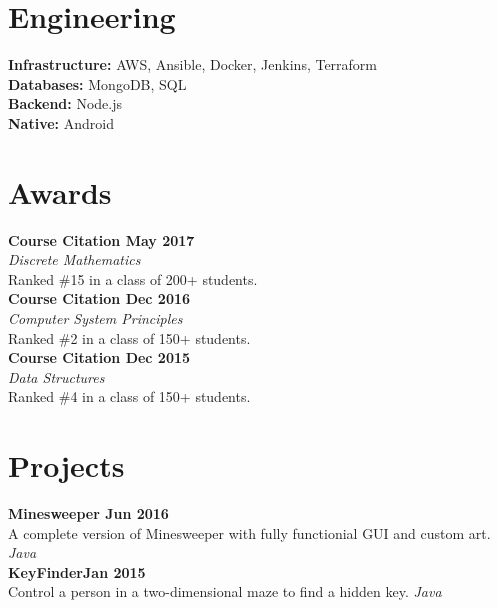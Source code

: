 \documentclass[letterpaper]{deedy-resume} %
\begin{document}
\begin{minipage}[t]{0.32\textwidth}
\section{Engineering}


{\bf Infrastructure:}
AWS, Ansible, Docker, Jenkins, Terraform \\  
{\bf Databases:}
MongoDB, SQL \\
{\bf Backend:} 
Node.js \\
{\bf Native:}
Android

\sectionspace %

\section{Awards}
{\bf Course Citation \hfill May 2017} \\ 
\textit{Discrete Mathematics} \\ 
Ranked \#15 in a class of 200+ students.\\
\vspace{2mm}
{\bf Course Citation \hfill Dec 2016} \\ 
\textit{Computer System Principles} \\ 
Ranked \#2 in a class of 150+ students.\\
\vspace{2mm}
{\bf Course Citation \hfill Dec 2015} \\ \textit{Data Structures} \\
 Ranked \#4 in a class of 150+ students.\\
 \vspace{2mm}

\section{Projects} 
{\bf Minesweeper \hfill Jun 2016} \\ A complete version of Minesweeper with fully functionial GUI and custom art. {\it Java} \\
{\bf KeyFinder\hfill Jan 2015} \\ Control a person in a two-dimensional maze to find a hidden key. {\it Java} 

\end{minipage} %
\hfill
%
\end{document}

